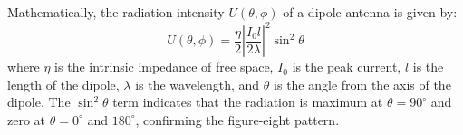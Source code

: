 Mathematically, the radiation intensity \( U(\theta, \phi) \) of a dipole antenna is given by:
\[
U(\theta, \phi) = \frac{\eta}{2} \left| \frac{I_0 l}{2 \lambda} \right|^2 \sin^2 \theta
\]
where \( \eta \) is the intrinsic impedance of free space, \( I_0 \) is the peak current, \( l \) is the length of the dipole, \( \lambda \) is the wavelength, and \( \theta \) is the angle from the axis of the dipole. The \( \sin^2 \theta \) term indicates that the radiation is maximum at \( \theta = 90^\circ \) and zero at \( \theta = 0^\circ \) and \( 180^\circ \), confirming the figure-eight pattern.

